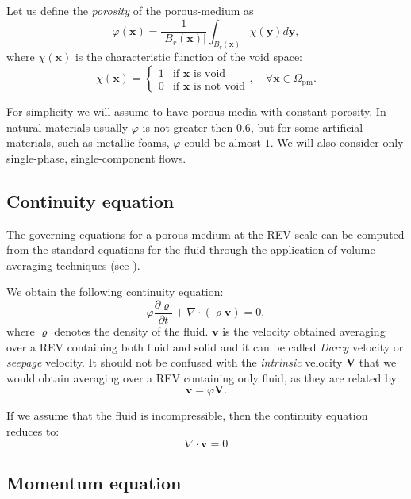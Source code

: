 Let us define the \emph{porosity} of the porous-medium as
\begin{equation}
\varphi(\mathbf{x}) = \frac{1}{|B_r(\mathbf{x})|} \int_{B_r(\mathbf{x})} \chi 
(\mathbf{y}) d\mathbf{y},
\end{equation}
where $\chi(\mathbf{x})$ is the characteristic function of the void space:
\begin{equation}
\chi(\mathbf{x}) =
\begin{cases}
1 &\text{if $\mathbf{x}$ is void}\\
0 &\text{if $\mathbf{x}$ is not void}
\end{cases}, \quad \forall \mathbf{x} \in \Omega_\text{pm}.
\end{equation}

For simplicity we will assume to have porous-media with constant porosity. In 
natural materials usually $\varphi$ is not greater then $0.6$, but for some 
artificial materials, such as metallic foams, $\varphi$ could be almost $1$.
We will also consider only single-phase, single-component flows.
%
\subsection{Continuity equation}
The governing equations for a porous-medium at the REV scale can be computed 
from the standard equations for the fluid through the application of volume 
averaging techniques (see \cite{volaver:withakerbook}).

We obtain the following continuity equation:
\begin{equation}
\varphi\frac{\partial \varrho}{\partial t} + \nabla \cdot (\varrho 
\mathbf{v}) = 0,
\end{equation}
where $\varrho$ denotes the density of the fluid. $\mathbf{v}$ is the velocity 
obtained averaging over a REV containing both fluid and solid and it can be 
called \emph{Darcy} velocity or \emph{seepage} velocity. It should not be 
confused with the \emph{intrinsic} velocity $\mathbf{V}$ that we would obtain 
averaging over a REV containing only fluid, as they are related by:
\begin{equation}
	\mathbf{v} = \varphi \mathbf{V}.
\end{equation}

If we assume that the fluid is incompressible, then the continuity equation 
reduces to:
\begin{equation} \label{eq:pmcontinuity}
\nabla \cdot \mathbf{v} = 0
\end{equation}
\subsection{Momentum equation}
